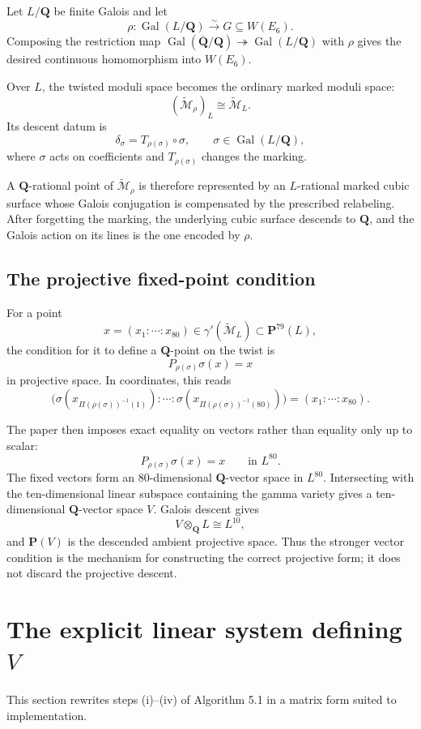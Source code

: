 \documentclass[11pt]{article}
\newcommand{\QQ}{\mathbf{Q}}
\newcommand{\PP}{\mathbf{P}}
\newcommand{\ol}[1]{\overline{#1}}
\newcommand{\Gal}{\operatorname{Gal}}
\newcommand{\tcM}{\widetilde{\mathcal{M}}}
\begin{document}
Let $L/\QQ$ be finite Galois and let
\[
  \rho:\Gal(L/\QQ)\xrightarrow{\sim}G\subseteq W(E_6).
\]
Composing the restriction map
$\Gal(\ol\QQ/\QQ)\twoheadrightarrow\Gal(L/\QQ)$ with $\rho$ gives the desired
continuous homomorphism into $W(E_6)$.

Over $L$, the twisted moduli space becomes the ordinary marked moduli space:
\[
  (\tcM_{\rho})_L\cong\tcM_L.
\]
Its descent datum is
\[
  \delta_\sigma=T_{\rho(\sigma)}\circ\sigma,
  \qquad \sigma\in\Gal(L/\QQ),
\]
where $\sigma$ acts on coefficients and $T_{\rho(\sigma)}$ changes the
marking.

A $\QQ$-rational point of $\tcM_{\rho}$ is therefore represented by an
$L$-rational marked cubic surface whose Galois conjugation is compensated by
the prescribed relabeling.  After forgetting the marking, the underlying
cubic surface descends to $\QQ$, and the Galois action on its lines is the one
encoded by $\rho$.

\subsection{The projective fixed-point condition}

For a point
\[
  x=(x_1:\cdots:x_{80})\in\gamma'(\tcM_L)\subset\PP^{79}(L),
\]
the condition for it to define a $\QQ$-point on the twist is
\[
  P_{\rho(\sigma)}\sigma(x)=x
\]
in projective space.  In coordinates, this reads
\[
 \bigl(\sigma(x_{\Pi(\rho(\sigma))^{-1}(1)}):\cdots:
       \sigma(x_{\Pi(\rho(\sigma))^{-1}(80)})\bigr)
   =(x_1:\cdots:x_{80}).
\]

The paper then imposes exact equality on vectors rather than equality only
up to scalar:
\[
  P_{\rho(\sigma)}\sigma(x)=x\qquad\text{in }L^{80}.
\]
The fixed vectors form an $80$-dimensional $\QQ$-vector space in $L^{80}$.
Intersecting with the ten-dimensional linear subspace containing the gamma
variety gives a ten-dimensional $\QQ$-vector space $V$.  Galois descent gives
\[
  V\otimes_{\QQ}L\cong L^{10},
\]
and $\PP(V)$ is the descended ambient projective space.  Thus the stronger
vector condition is the mechanism for constructing the correct projective
form; it does not discard the projective descent.

\section{The explicit linear system defining $V$}

This section rewrites steps (i)--(iv) of Algorithm 5.1 in a matrix form suited
to implementation.
\end{document}
